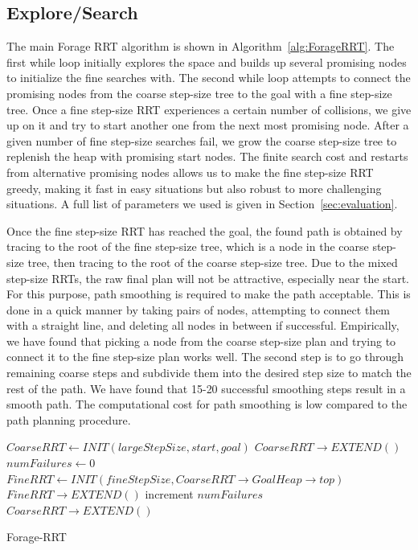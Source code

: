 \documentclass[conference]{IEEEtran}
\begin{document}
\subsection{Explore/Search}
The main Forage RRT algorithm is shown in Algorithm~\ref{alg:ForageRRT}. The
first while loop initially explores the space and builds up several promising 
nodes to initialize the fine searches with. The second while loop attempts to 
connect the promising nodes from the coarse step-size tree to the goal with a 
fine step-size tree. Once a fine step-size RRT experiences a certain number 
of collisions, we give up on it and try to start another one from the next 
most promising node. After a given number of fine step-size searches fail, 
we grow the coarse step-size tree to replenish the heap with promising 
start nodes. The finite search cost and restarts from alternative promising
nodes allows us to make the fine step-size RRT greedy, making it fast in
easy situations but also robust to more challenging situations. A full list
of parameters we used is given in Section~\ref{sec:evaluation}.

Once the fine step-size RRT has reached the goal, the found path is obtained
by tracing to the root of the fine step-size tree, which is a node in the
coarse step-size tree, then tracing to the root of the coarse step-size tree.
Due to the mixed step-size RRTs, the raw final plan will not be attractive, 
especially near the start. For this purpose, path smoothing is required to 
make the path acceptable. This is done in a quick manner by taking pairs of
nodes, attempting to connect them with a straight line, and deleting all
nodes in between if successful. Empirically, we have found that
picking a node from the coarse step-size plan and trying to connect it to 
the fine step-size plan works well.  The second step is to go through
remaining coarse steps and subdivide them into the desired step size to
match the rest of the path.  We have found that 15-20 successful smoothing 
steps result in a smooth path.  The computational cost for path smoothing is
low compared to the path planning procedure.

\begin{algorithm}
  \label{alg:ForageRRT}
  \SetAlgoLined
  $CoarseRRT \leftarrow INIT(largeStepSize, start, goal)$\;
   {
	$CoarseRRT \rightarrow EXTEND()$\;
   }
   {
    $numFailures \leftarrow 0$\;
	$FineRRT \leftarrow INIT(fineStepSize, 
	                         CoarseRRT \rightarrow GoalHeap \rightarrow top)$\;
	 {
	  $FineRRT \rightarrow EXTEND()$\;
	 }
	increment $numFailures$ \;
	 {
	   {
		$CoarseRRT \rightarrow EXTEND()$\;
	   }
	 }
   }
  \caption{Forage-RRT}
\end{algorithm}
\end{document}

